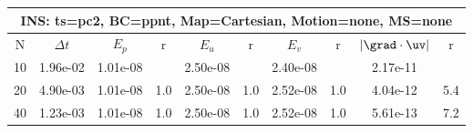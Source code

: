 
\begin{tabular}{|c|c|c|c|c|c|c|c|c|c|} \hline
 \multicolumn{10}{|c|}{INS: ts=pc2, BC=ppnt, Map=Cartesian, Motion=none, MS=none } \\ \hline 
     N  &   $\Delta t$ & $E_p$   &  r  &   $E_u$   &   r    &   $E_v$   & r   &  $|\grad\cdot\uv|$  & r   \\ \hline 
  10   &  1.96e-02  &   1.01e-08  &        &   2.50e-08  &        &   2.40e-08  &        &   2.17e-11  &        \\ 
  20   &  4.90e-03  &   1.01e-08  & 1.0  &   2.50e-08  & 1.0  &   2.52e-08  & 1.0  &   4.04e-12  & 5.4  \\ 
  40   &  1.23e-03  &   1.01e-08  & 1.0  &   2.50e-08  & 1.0  &   2.52e-08  & 1.0  &   5.61e-13  & 7.2  \\ 
 \hline 
\end{tabular}

